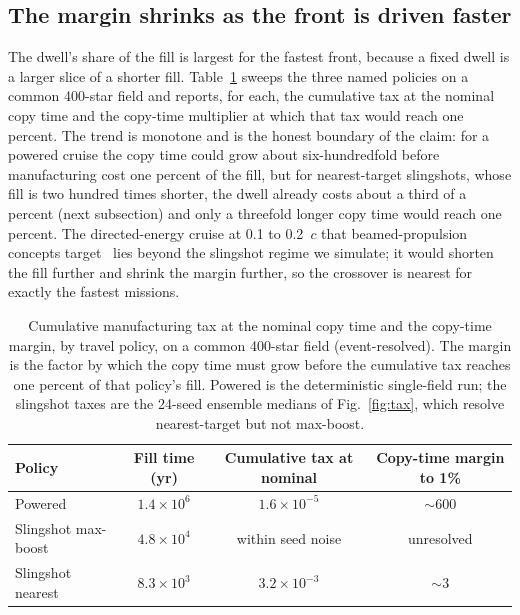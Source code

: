 \subsection{The margin shrinks as the front is driven faster}
The dwell's share of the fill is largest for the fastest front, because a fixed dwell is a
larger slice of a shorter fill. Table~\ref{tab:policy} sweeps the three named policies on a
common 400-star field and reports, for each, the cumulative tax at the nominal copy time and the
copy-time multiplier at which that tax would reach one percent. The trend is monotone and is the
honest boundary of the claim: for a powered cruise the copy time could grow about six-hundredfold
before manufacturing cost one percent of the fill, but for nearest-target slingshots, whose fill
is two hundred times shorter, the dwell already costs about a third of a percent (next
subsection) and only a threefold longer copy time would reach one percent. The directed-energy
cruise at 0.1 to 0.2~$c$ that beamed-propulsion concepts
target~\citep{lubin-2016,armstrong-sandberg-2013} lies beyond the slingshot regime we simulate;
it would shorten the fill further and shrink the margin further, so the crossover is nearest for
exactly the fastest missions.

\begin{table}[t]
\caption{Cumulative manufacturing tax at the nominal copy time and the copy-time margin, by
travel policy, on a common 400-star field (event-resolved). The margin is the factor by which
the copy time must grow before the cumulative tax reaches one percent of that policy's fill.
Powered is the deterministic single-field run; the slingshot taxes are the 24-seed ensemble
medians of Fig.~\ref{fig:tax}, which resolve nearest-target but not max-boost.}
\label{tab:policy}
\centering
\begin{tabular}{lccc}
\toprule
Policy & Fill time (yr) & Cumulative tax at nominal & Copy-time margin to 1\% \\
\midrule
Powered             & $1.4\times10^{6}$ & $1.6\times10^{-5}$ & $\sim$600 \\
Slingshot max-boost & $4.8\times10^{4}$ & within seed noise  & unresolved \\
Slingshot nearest   & $8.3\times10^{3}$ & $3.2\times10^{-3}$ & $\sim$3 \\
\bottomrule
\end{tabular}
\end{table}

